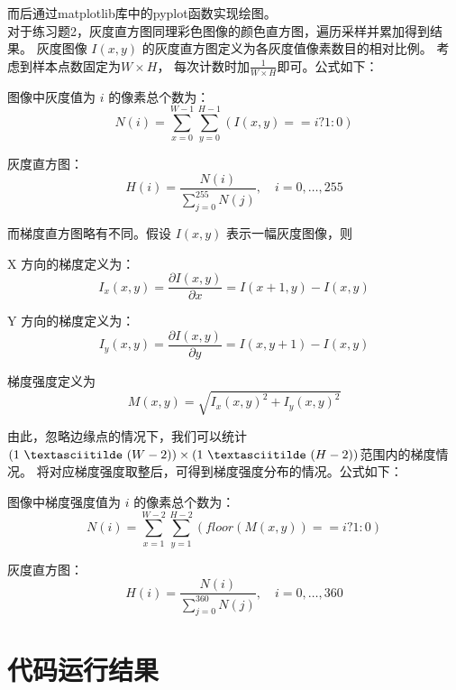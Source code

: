 \documentclass{article}
\begin{document}
    而后通过matplotlib库中的pyplot函数实现绘图。\\

    对于练习题2，灰度直方图同理彩色图像的颜色直方图，遍历采样并累加得到结果。
    灰度图像 \( I(x, y) \) 的灰度直方图定义为各灰度值像素数目的相对比例。
    考虑到样本点数固定为\( W \times H \)， 每次计数时加\(\frac{1}{ W \times H} \)即可。公式如下：

    图像中灰度值为 \( i \) 的像素总个数为：
    \[
    N(i) = \sum_{x=0}^{W-1} \sum_{y=0}^{H-1} \left( I(x, y) == i ? 1 : 0 \right)
    \]

    灰度直方图：
    \[
    H(i) = \frac{N(i)}{\sum\limits_{j=0}^{255} N(j)}, \quad i = 0, \dots, 255
    \]


    而梯度直方图略有不同。假设 \( I(x, y) \) 表示一幅灰度图像，则

    X 方向的梯度定义为：
    \[
    I_x(x, y) = \frac{\partial I(x, y)}{\partial x} = I(x+1, y) - I(x, y)
    \]

    Y 方向的梯度定义为：
    \[
    I_y(x, y) = \frac{\partial I(x, y)}{\partial y} = I(x, y+1) - I(x, y)
    \]

    梯度强度定义为
    \[
    M(x, y) = \sqrt{I_x(x, y)^2 + I_y(x, y)^2}
    \]

    由此，忽略边缘点的情况下，我们可以统计\((1 ~\textasciitilde ~(W - 2))
    \times (1 ~\textasciitilde ~(H - 2))\)范围内的梯度情况。
    将对应梯度强度取整后，可得到梯度强度分布的情况。公式如下：

    图像中梯度强度值为 \( i \) 的像素总个数为：
    \[
    N(i) = \sum_{x=1}^{W-2} \sum_{y=1}^{H-2} \left( floor(M(x, y)) == i ? 1 : 0 \right)
    \]

    灰度直方图：
    \[
    H(i) = \frac{N(i)}{\sum\limits_{j=0}^{360} N(j)}, \quad i = 0, \dots, 360
    \]

\section{代码运行结果}
\end{document}
